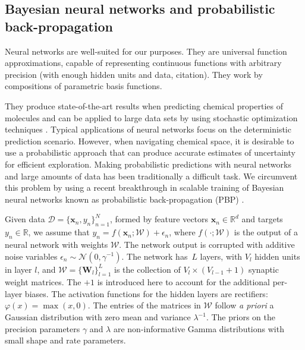 \subsection{Bayesian neural networks and probabilistic back-propagation}

Neural networks are well-suited for our purposes. They are universal function approximations, capable of representing continuous functions with arbitrary precision (with enough hidden units and data, citation). They work by compositions of parametric basis functions.


They produce state-of-the-art results when predicting chemical properties of molecules \cite{Ma_2015,Mayr_2016,ramsundar2015massively} and can be applied to large data sets by using stochastic optimization techniques \cite{bousquet2008tradeoffs}. Typical applications of neural networks focus on the deterministic prediction scenario. 
However, when navigating chemical space, it is desirable to use a probabilistic approach that can produce accurate estimates of uncertainty for efficient exploration. Making probabilistic predictions with neural networks and large amounts of data has been traditionally a difficult task. We circumvent this problem by using a recent breakthrough in scalable training of Bayesian neural networks known as probabilistic back-propagation (PBP) \cite{hernandez2015probabilistic}. 

Given data ${\mathcal{D} = \{\mathbf{x}_n, y_n \}_{n=1}^N}$, formed by feature vectors $\mathbf{x}_n \in \mathbb{R}^d$ and targets ${y_n \in \mathbb{R}}$, we assume that $y_n = f(\mathbf{x}_n;\mathcal{W}) + \epsilon_n$, where $f(\cdot ;\mathcal{W})$ is the output of a neural network with weights $\mathcal{W}$. The network output is corrupted with additive noise variables $\epsilon_n \sim \mathcal{N}(0,\gamma^{-1})$. The network has~$L$ layers, with $V_l$ hidden units in layer $l$, and $\mathcal{W} = \{ \mathbf{W}_l \}_{l=1}^L$ is the collection of $V_l \times (V_{l-1}+1)$ synaptic weight matrices. The $+1$ is introduced here to account for the additional per-layer biases. The activation functions for the hidden layers are rectifiers: $\varphi(x) = \max(x,0)$. The entries of the matrices in $\mathcal{W}$ follow \emph{a priori} a Gaussian distribution with zero mean and variance $\lambda^{-1}$. The priors on the precision parameters $\gamma$ and $\lambda$ are non-informative Gamma distributions with small shape and rate parameters.

